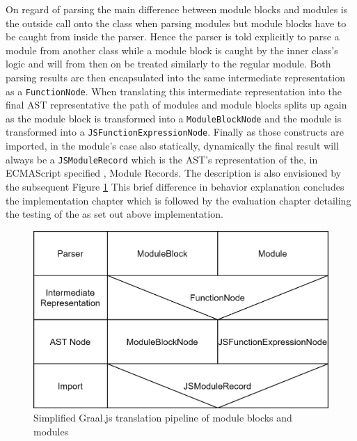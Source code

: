 On regard of parsing the main difference between module blocks and modules is the outside call onto the class when parsing modules but module blocks have to be caught from inside the parser. Hence the parser is told explicitly to parse a module from another class while a module block is caught by the inner class's logic and will from then on be treated similarly to the regular module. Both parsing results are then encapsulated into the same intermediate representation as a \texttt{FunctionNode}. When translating this intermediate representation into the final AST representative the path of modules and module blocks splits up again as the module block is transformed into a \texttt{ModuleBlockNode} and the module is transformed into a \texttt{JSFunctionExpressionNode}. Finally as those constructs are imported, in the module's case also statically, dynamically the final result will always be a \texttt{JSModuleRecord} which is the AST's representation of the, in ECMAScript specified \cite{ecma}, Module Records. The description is also envisioned by the subsequent Figure \ref{fig:blockVSmodule} This brief difference in behavior explanation concludes the implementation chapter which is followed by the evaluation chapter detailing the testing of the as set out above implementation.

\begin{figure}[h!]
    \centering
    \includegraphics[scale=0.165]{figures/ModuleBlockVSModule.png}
    \caption{Simplified Graal.js translation pipeline of module blocks and modules}
    \label{fig:blockVSmodule}
\end{figure}